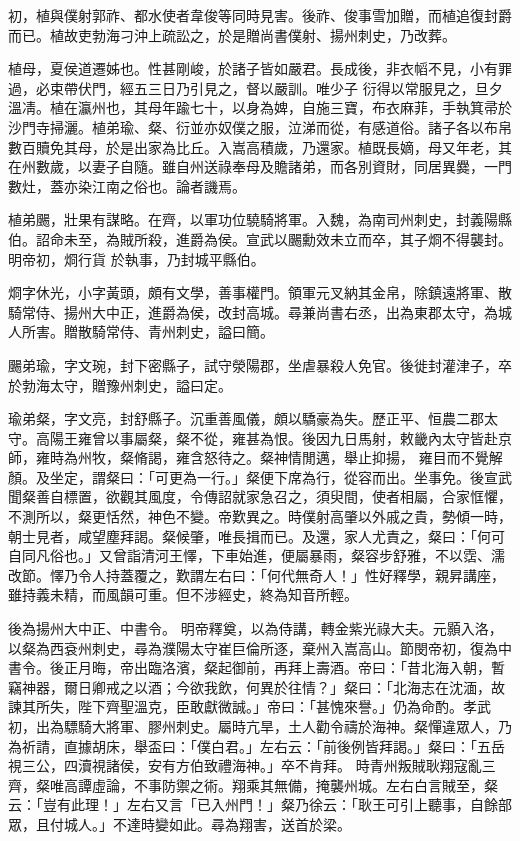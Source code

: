 \begin{pinyinscope}
 初，植與僕射郭祚、都水使者韋俊等同時見害。後祚、俊事雪加贈，而植追復封爵而已。植故吏勃海刁沖上疏訟之，於是贈尚書僕射、揚州刺史，乃改葬。



 植母，夏侯道遷姊也。性甚剛峻，於諸子皆如嚴君。長成後，非衣幍不見，小有罪過，必束帶伏門，經五三日乃引見之，督以嚴訓。唯少子
 衍得以常服見之，旦夕溫凊。植在瀛州也，其母年踰七十，以身為婢，自施三寶，布衣麻菲，手執箕帚於沙門寺掃灑。植弟瑜、粲、衍並亦奴僕之服，泣涕而從，有感道俗。諸子各以布帛數百贖免其母，於是出家為比丘。入嵩高積歲，乃還家。植既長嫡，母又年老，其在州數歲，以妻子自隨。雖自州送祿奉母及贍諸弟，而各別資財，同居異爨，一門數灶，蓋亦染江南之俗也。論者譏焉。



 植弟颺，壯果有謀略。在齊，以軍功位驍騎將軍。入魏，為南司州刺史，封義陽縣伯。詔命未至，為賊所殺，進爵為侯。宣武以颺勳效未立而卒，其子烱不得襲封。明帝初，烱行貨
 於執事，乃封城平縣伯。



 烱字休光，小字黃頭，頗有文學，善事權門。領軍元叉納其金帛，除鎮遠將軍、散騎常侍、揚州大中正，進爵為侯，改封高城。尋兼尚書右丞，出為東郡太守，為城人所害。贈散騎常侍、青州刺史，謚曰簡。



 颺弟瑜，字文琬，封下密縣子，試守滎陽郡，坐虐暴殺人免官。後徙封灌津子，卒於勃海太守，贈豫州刺史，謚曰定。



 瑜弟粲，字文亮，封舒縣子。沉重善風儀，頗以驕豪為失。歷正平、恒農二郡太守。高陽王雍曾以事屬粲，粲不從，雍甚為恨。後因九日馬射，敕畿內太守皆赴京師，雍時為州牧，粲脩謁，雍含怒待之。粲神情閒邁，舉止抑揚，
 雍目而不覺解顏。及坐定，謂粲曰：「可更為一行。」粲便下席為行，從容而出。坐事免。後宣武聞粲善自標置，欲觀其風度，令傳詔就家急召之，須臾間，使者相屬，合家恇懼，不測所以，粲更恬然，神色不變。帝歎異之。時僕射高肇以外戚之貴，勢傾一時，朝士見者，咸望塵拜謁。粲候肇，唯長揖而已。及還，家人尤責之，粲曰：「何可自同凡俗也。」又曾詣清河王懌，下車始進，便屬暴雨，粲容步舒雅，不以霑、濡改節。懌乃令人持蓋覆之，歎謂左右曰：「何代無奇人！」性好釋學，親昇講座，雖持義未精，而風韻可重。但不涉經史，終為知音所輕。



 後為揚州大中正、中書令。
 明帝釋奠，以為侍講，轉金紫光祿大夫。元顥入洛，以粲為西袞州刺史，尋為濮陽太守崔巨倫所逐，棄州入嵩高山。節閔帝初，復為中書令。後正月晦，帝出臨洛濱，粲起御前，再拜上壽酒。帝曰：「昔北海入朝，暫竊神器，爾日卿戒之以酒；今欲我飲，何異於往情？」粲曰：「北海志在沈湎，故諫其所失，陛下齊聖溫克，臣敢獻微誠。」帝曰：「甚愧來譽。」仍為命酌。孝武初，出為驃騎大將軍、膠州刺史。屬時亢旱，土人勸令禱於海神。粲憚違眾人，乃為祈請，直據胡床，舉盃曰：「僕白君。」左右云：「前後例皆拜謁。」粲曰：「五岳視三公，四瀆視諸侯，安有方伯致禮海神。」卒不肯拜。
 時青州叛賊耿翔寇亂三齊，粲唯高譚虛論，不事防禦之術。翔乘其無備，掩襲州城。左右白言賊至，粲云：「豈有此理！」左右又言「已入州門！」粲乃徐云：「耿王可引上聽事，自餘部眾，且付城人。」不達時變如此。尋為翔害，送首於梁。




\end{pinyinscope}
